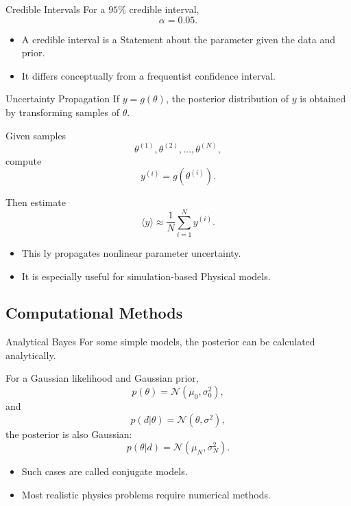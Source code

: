 \documentclass[a4paper, 10pt, onepage]{elegantbook}
\begin{document}
{\begin{frame}{Credible Intervals}
  For a \(95\%\) credible interval,
  \[
    \alpha=0.05.
  \]

  \begin{itemize}
    \item A credible interval is a Statement about the parameter given the data and prior.
    \item It differs conceptually from a frequentist confidence interval.
  \end{itemize}
\end{frame}

\begin{frame}{Uncertainty Propagation}
  If \(y=g(\theta)\), the posterior distribution of \(y\) is obtained by transforming samples of \(\theta\).

  Given samples
  \[
    \theta^{(1)},\theta^{(2)},\ldots,\theta^{(N)},
  \]
  compute
  \[
    y^{(i)}=g\left(\theta^{(i)}\right).
  \]

  Then estimate
  \[
    \langle y\rangle
    \approx
    \frac{1}{N}\sum_{i=1}^{N}y^{(i)}.
  \]

  \begin{itemize}
    \item This ly propagates nonlinear parameter uncertainty.
    \item It is especially useful for simulation-based Physical models.
  \end{itemize}
\end{frame}

\subsection{Computational Methods}

\begin{frame}{Analytical Bayes}
  For some simple models, the posterior can be calculated analytically.

  For a Gaussian likelihood and Gaussian prior,
  \[
    p(\theta)
    =
    \mathcal{N}(\mu_0,\sigma_0^2),
  \]
  and
  \[
    p(d|\theta)
    =
    \mathcal{N}(\theta,\sigma^2),
  \]
  the posterior is also Gaussian:
  \[
    p(\theta|d)
    =
    \mathcal{N}(\mu_N,\sigma_N^2).
  \]

  \begin{itemize}
    \item Such cases are called conjugate models.
    \item Most realistic physics problems require numerical methods.
  \end{itemize}
\end{frame}

}
\end{document}
